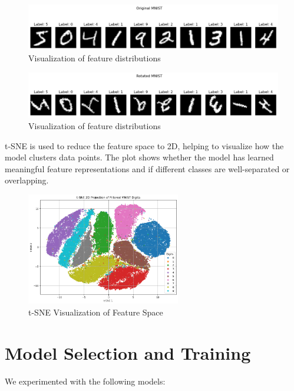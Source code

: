 \documentclass[12pt]{article}
\begin{document}
\begin{figure}[h!]
    \centering
    \includegraphics[width=1.0\textwidth]{pics/1output.png}
    \caption{Visualization of feature distributions}
\end{figure}

\begin{figure}[h!]
    \centering
    \includegraphics[width=1.0\textwidth]{pics/2output.png}
    \caption{Visualization of feature distributions}
\end{figure}

t-SNE is used to reduce the feature space to 2D, helping to visualize how the model clusters data points. The plot shows whether the model has learned meaningful feature representations and if different classes are well-separated or overlapping.

\begin{figure}[H]
\centering
\includegraphics[width=0.6\textwidth]{pics/tsne.png}
\caption{t-SNE Visualization of Feature Space}
\end{figure}

\section{Model Selection and Training}
We experimented with the following models:
\end{document}
